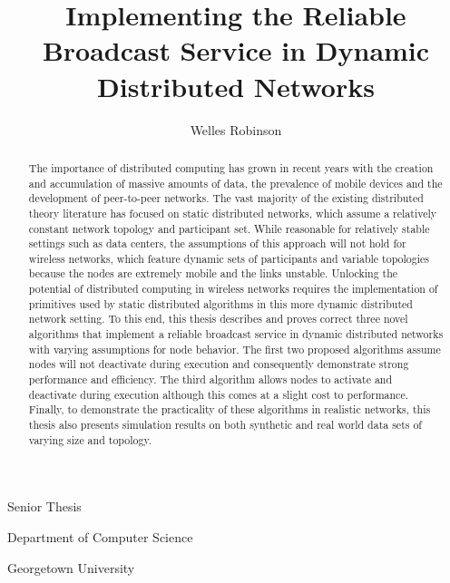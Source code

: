 \documentclass[english]{article}
\begin{document}
\title{Implementing the Reliable Broadcast Service in Dynamic Distributed Networks}

\maketitle
\begin{center}\author{Welles Robinson}\end{center}
\noindent \begin{center}Senior Thesis\par\end{center}
\noindent \begin{center}Department of Computer
Science\par\end{center}
\noindent \begin{center}Georgetown University\par\end{center}

\newtheorem{definition} {Definition}
\newcommand{\mydef}[1]{\begin{definition}#1\end{definition}}

\begin{abstract}
The importance of distributed computing has grown in recent years with the creation and accumulation of massive amounts of data, the prevalence of mobile devices and the development of peer-to-peer networks. The vast majority of the existing distributed theory literature has focused on static distributed networks, which assume a relatively constant network topology and participant set. While reasonable for relatively stable settings such as data centers, the assumptions of this approach will not hold for wireless networks, which feature dynamic sets of participants and variable topologies because the nodes are extremely mobile and the links unstable. Unlocking the potential of distributed computing in wireless networks requires the implementation of primitives used by static distributed algorithms in this more dynamic distributed network setting. To this end, this thesis describes and proves correct three novel algorithms that implement a reliable broadcast service in dynamic distributed networks with varying assumptions for node behavior. The first two proposed algorithms assume nodes will not deactivate during execution and consequently demonstrate strong performance and efficiency. The third algorithm allows nodes to activate and deactivate during execution although this comes at a slight cost to performance. Finally, to demonstrate the practicality of these algorithms in realistic networks, this thesis also presents simulation results on both synthetic and real world data sets of varying size and topology.
\end{abstract}
\end{document}
